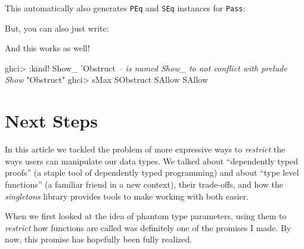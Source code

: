 \documentclass[]{article}
\newenvironment{Shaded}{}{}
\newcommand{\CommentTok}[1]{\textcolor[rgb]{0.38,0.63,0.69}{\textit{#1}}}
\newcommand{\DataTypeTok}[1]{\textcolor[rgb]{0.56,0.13,0.00}{#1}}
\newcommand{\FunctionTok}[1]{\textcolor[rgb]{0.02,0.16,0.49}{#1}}
\newcommand{\NormalTok}[1]{#1}
\newcommand{\StringTok}[1]{\textcolor[rgb]{0.25,0.44,0.63}{#1}}
\begin{document}
This automatically also generates \texttt{PEq} and \texttt{SEq} instances for
\texttt{Pass}:

\begin{Shaded}
\end{Shaded}

But, you can also just write:

\begin{Shaded}
\end{Shaded}

And this works as well!

\begin{Shaded}
\begin{Highlighting}[]
\NormalTok{ghci}\FunctionTok{>} \FunctionTok{:}\NormalTok{kind}\FunctionTok{!} \DataTypeTok{Show_}\NormalTok{ '}\DataTypeTok{Obstruct}      \CommentTok{-- is named Show_ to not conflict with prelude Show}
\StringTok{"Obstruct"}
\NormalTok{ghci}\FunctionTok{>}\NormalTok{ sMax }\DataTypeTok{SObstruct} \DataTypeTok{SAllow}
\DataTypeTok{SAllow}
\end{Highlighting}
\end{Shaded}

\hypertarget{next-steps}{%
\section{Next Steps}\label{next-steps}}

In this article we tackled the problem of more expressive ways to
\emph{restrict} the ways users can manipulate our data types. We talked about
``dependently typed proofs'' (a staple tool of dependently typed programming)
and about ``type level functions'' (a familiar friend in a new context), their
trade-offs, and how the \emph{singletons} library provides tools to make working
with both easier.

When we first looked at the idea of phantom type parameters, using them to
\emph{restrict} how functions are called was definitely one of the promises I
made. By now, this promise has hopefully been fully realized.
\end{document}
